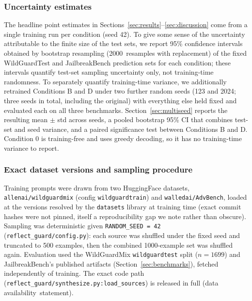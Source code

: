 \documentclass[superintelligence,article,accept,moreauthors]{Definitions/mdpi}
\begin{document}
\subsubsection{Uncertainty estimates %
} The headline point estimates in Sections~\ref{sec:results}--\ref{sec:discussion} come from a single training run per condition (seed 42). To give some sense of the uncertainty attributable to the finite size of the test sets, we report 95\% confidence intervals obtained by bootstrap resampling (2000~resamples with replacement) of the fixed WildGuardTest and JailbreakBench prediction sets for each condition; these intervals quantify test-set sampling uncertainty only, not training-time randomness. To separately quantify training-time variance, we additionally retrained Conditions B and D under two further random seeds (123 and 2024; three seeds in total, including the original) with everything else held fixed and evaluated each on all three benchmarks. Section~\ref{sec:multiseed} reports the resulting mean $\pm$ std across seeds, a pooled bootstrap 95\% CI that combines test-set and seed variance, and a paired significance test between Conditions B and D. Condition 0 is training-free and uses greedy decoding, so it has no training-time variance to report.

\subsubsection{Exact dataset versions and sampling procedure} Training prompts were drawn from two HuggingFace datasets, \texttt{allenai/wildguardmix} (config \texttt{wildguardtrain}) and \texttt{walledai/AdvBench}, loaded at the versions resolved by the \texttt{datasets} library at training time (exact commit hashes were not pinned, itself a reproducibility gap we note rather than obscure). Sampling was deterministic given \texttt{RANDOM\_SEED = 42} (\texttt{reflect\_guard/config.py}): each source was shuffled under the fixed seed and truncated to 500 examples, then the combined 1000-example set was shuffled again. Evaluation used the WildGuardMix \texttt{wildguardtest} split ($n=1699$) and JailbreakBench's published artifacts (Section~\ref{sec:benchmarks}), fetched independently of training. The exact code path (\texttt{reflect\_guard/synthesize.py:load\_sources}) is released in full (data \mbox{availability statement}).
\end{document}
